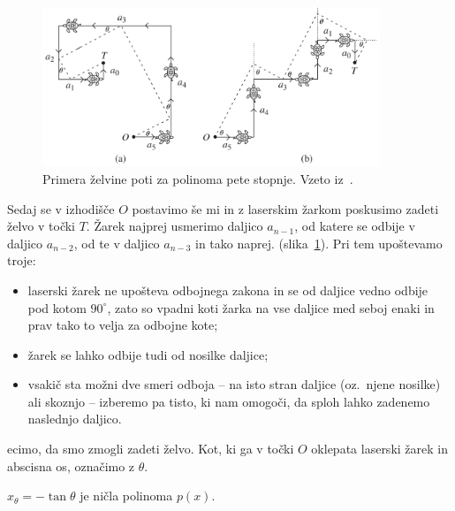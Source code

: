 \begin{figure}[h]
    \centering
    \includegraphics[width=0.9\textwidth]{images/kubična enačba/primera_zelvine_poti.png}
    \caption[Primera želvine poti]{Primera želvine poti za polinoma pete stopnje. Vzeto iz~\cite[str.\ 311]{hull2011}.}
    \label{fig:primera_zelve}
\end{figure}

Sedaj se v izhodišče $O$ postavimo še mi in z laserskim žarkom poskusimo zadeti želvo v točki $T$. Žarek najprej usmerimo daljico $a_{n-1}$, od katere se odbije v daljico $a_{n-2}$, od te v daljico $a_{n-3}$ in tako naprej. (slika~\ref{fig:primera_zelve}). Pri tem upoštevamo troje:
\begin{itemize}
    \item laserski žarek ne upošteva odbojnega zakona in se od daljice vedno odbije pod kotom $90^\circ$, zato so vpadni koti žarka na vse daljice med seboj enaki in prav tako to velja za odbojne kote;
    \item žarek se lahko odbije tudi od nosilke daljice;
    \item vsakič sta možni dve smeri odboja -- na isto stran daljice (oz.\ njene nosilke) ali skoznjo -- izberemo pa tisto, ki nam omogoči, da sploh lahko zadenemo naslednjo daljico.
\end{itemize}
ecimo, da smo zmogli zadeti želvo. Kot, ki ga v točki $O$ oklepata laserski žarek in abscisna os, označimo z $\theta$.

\begin{trditev}
    $x_{\theta} = - \tan \theta$ je ničla polinoma $p(x)$.
\end{trditev}

